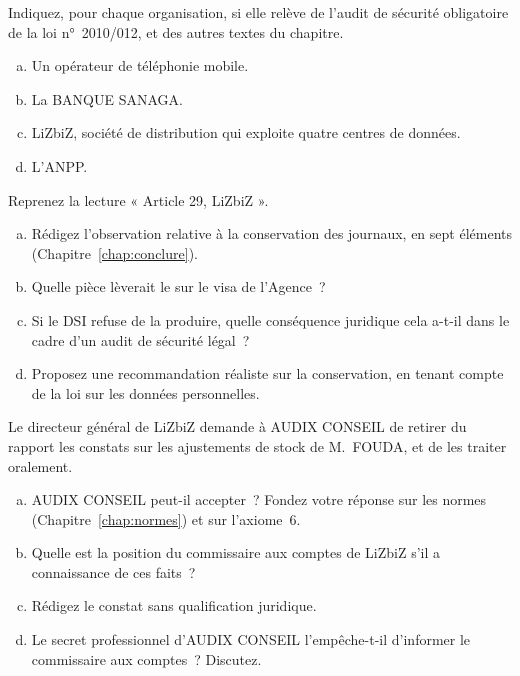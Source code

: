 \bigskip

\begin{boxexo}[title={\ding{45}\quad Exercice~15.1. Assujetti ou non~? \niveaubase}]
Indiquez, pour chaque organisation, si elle relève de l'audit de sécurité
obligatoire de la loi n°~2010/012, et des autres textes du chapitre.
\begin{enumerate}[(a)]
    \item Un opérateur de téléphonie mobile.
    \item La BANQUE SANAGA.
    \item LiZbiZ, société de distribution qui exploite quatre centres de
          données.
    \item L'ANPP.
\end{enumerate}
\end{boxexo}

\begin{boxexo}[title={\ding{45}\quad Exercice~15.2. Rédiger un constat légal \niveaumoyen}]
Reprenez la lecture « Article 29, LiZbiZ ».
\begin{enumerate}[(a)]
    \item Rédigez l'observation relative à la conservation des journaux, en
          sept éléments (Chapitre~\ref{chap:conclure}).
    \item Quelle pièce lèverait le \NEK{} sur le visa de l'Agence~?
    \item Si le DSI refuse de la produire, quelle conséquence juridique
          cela a-t-il dans le cadre d'un audit de sécurité légal~?
    \item Proposez une recommandation réaliste sur la conservation, en
          tenant compte de la loi sur les données personnelles.
\end{enumerate}
\end{boxexo}

\begin{boxexo}[title={\ding{45}\quad Exercice~15.3. Taire ou révéler~? \niveauexpert}]
Le directeur général de LiZbiZ demande à AUDIX CONSEIL de retirer du rapport
les constats sur les ajustements de stock de M.~FOUDA, et de les traiter
oralement.
\begin{enumerate}[(a)]
    \item AUDIX CONSEIL peut-il accepter~? Fondez votre réponse sur les
          normes (Chapitre~\ref{chap:normes}) et sur l'axiome~6.
    \item Quelle est la position du commissaire aux comptes de LiZbiZ s'il
          a connaissance de ces faits~?
    \item Rédigez le constat sans qualification juridique.
    \item Le secret professionnel d'AUDIX CONSEIL l'empêche-t-il
          d'informer le commissaire aux comptes~? Discutez.
\end{enumerate}
\end{boxexo}

